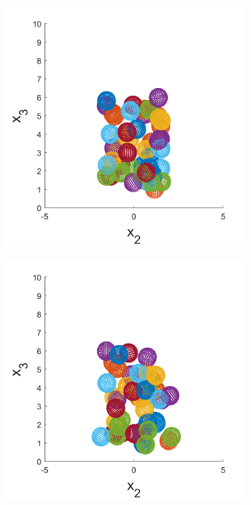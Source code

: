 \begin{figure}
\centering
\begin{subfigure}[b]{0.22\textwidth}
    \centering
    \includegraphics[width=\textwidth]{Images/squirmers/Gyro-1-All.pdf}
    \caption[]{\label{fig:squirmerPosA}}
\end{subfigure}
\begin{subfigure}[b]{0.22\textwidth}
    \centering
    \includegraphics[width=\textwidth]{Images/squirmers/Gyro-2-All.pdf}

\end{subfigure}
\end{figure}
